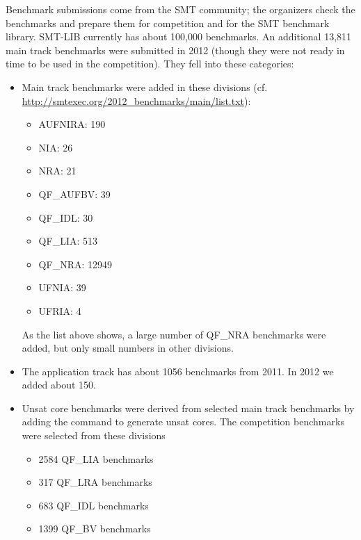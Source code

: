 \documentclass{llncs}
\begin{document}
Benchmark submissions come from the SMT community; the organizers check the benchmarks and prepare them for competition and for the SMT benchmark library.
SMT-LIB currently has about 100,000 benchmarks. An additional 13,811 main track benchmarks were submitted in 2012 (though they were not ready in time to be used in the competition). They fell into these categories:
\begin{itemize}
\item Main track benchmarks were added in these divisions (cf. \url{http://smtexec.org/2012_benchmarks/main/list.txt}):
\begin{itemize}
\item AUFNIRA: 190
\item NIA: 26
\item NRA: 21
\item QF\_AUFBV: 39
\item QF\_IDL: 30
\item QF\_LIA: 513
\item QF\_NRA: 12949
\item UFNIA: 39
\item UFRIA: 4
\end{itemize}
As the list above shows, a large number of QF\_NRA benchmarks were added, but only small numbers in other divisions.
\item The application track has about 1056 benchmarks from 2011. In 2012 we added about 150.
\item Unsat core benchmarks were derived from selected main track benchmarks by adding the command to generate unsat cores. The competition benchmarks were selected from these divisions
\begin{itemize}
\item 2584 QF\_LIA benchmarks
\item  317 QF\_LRA benchmarks
\item  683 QF\_IDL benchmarks
\item 1399 QF\_BV benchmarks
\end{itemize}
\end{itemize}
\end{document}
